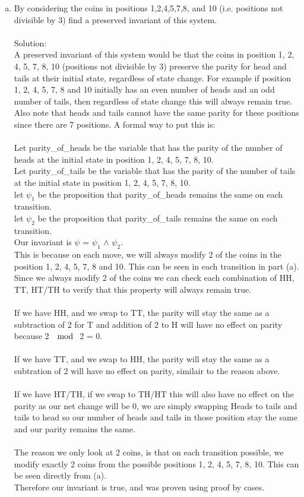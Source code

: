 \documentclass{article}
\newcommand*\moveToRight[1]{\hspace*{0em plus 1fill}\makebox{(#1)}}
\begin{document}
\begin{enumerate}[(a)]
    
    
    \item By considering the coins in positions 1,2,4,5,7,8, and 10 (i.e. positions not divisible by 3) find a preserved invariant of this system. \moveToRight{4 marks}\\\\
    Solution:\\
    A preserved invariant of this system would be that the coins in position 1, 2, 4, 5, 7, 8, 10 (positions not divisible by 3) preserve the parity for head and tails at their initial state, regardless of state change. For example if position 1, 2, 4, 5, 7, 8 and 10 initially has an even number of heads and an odd number of tails, then regardless of state change this will always remain true. Also note that heads and tails cannot have the same parity for these positions since there are 7 positions. 
    A formal way to put this is:\\\\
    Let parity\_of\_heads be the variable that has the parity of the number of heads at the initial state in position 1, 2, 4, 5, 7, 8, 10.\\
    Let parity\_of\_tails be the variable that has the parity of the number of tails at the initial state in position 1, 2, 4, 5, 7, 8, 10.\\
    let $\psi_1$ be the proposition that parity\_of\_heads remains the same on each transition.\\
    let $\psi_2$ be the proposition that parity\_of\_tails remains the same on each transition. \\
    Our invariant is $\psi$ = $\psi_1$ $\land$ $\psi_2$.\\
    This is because on each move, we will always modify 2 of the coins in the position 1, 2, 4, 5, 7, 8 and 10. This can be seen in each transition in part (a). Since we always modify 2 of the coins we can check each combination of HH, TT, HT/TH to verify that this property will always remain true.\\\\
    If we have HH, and we swap to TT, the parity will stay the same as a subtraction of 2 for T and addition of 2 to H will have no effect on parity because 2 $\mod$ 2 = 0.\\\\
    If we have TT, and we swap to HH, the parity will stay the same as a subtration of 2 will have no effect on parity, similair to the reason above.\\\\
    If we have HT/TH, if we swap to TH/HT this will also have no effect on the parity as our net change will be 0, we are simply swapping Heads to tails and tails to head so our number of heads and tails in those position stay the same and our parity remains the same.\\\\
    The reason we only look at 2 coins, is that on each transition possible, we modify exactly 2 coins from the possible positions 1, 2, 4, 5, 7, 8, 10. This can be seen directly from (a).\\
    Therefore our invariant is true, and was proven using proof by cases.
        

\end{enumerate}
\end{document}
